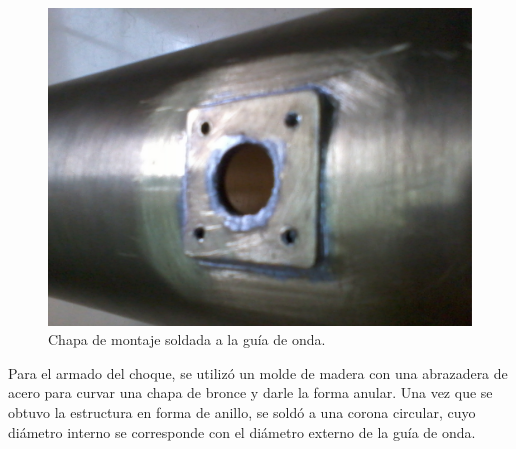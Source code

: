 \begin{figure} [H]
\centering 
\includegraphics[scale = 0.17]{Figures/Resultados/resultados_5}
\caption{Chapa de montaje soldada a la guía de onda.}
\label{fig_resultados:5}
\end{figure}
Para el armado del choque, se utilizó un molde de madera con una abrazadera de acero para curvar una chapa de bronce y darle la forma anular. Una vez que se obtuvo la estructura en forma de anillo, se soldó a una corona circular, cuyo diámetro interno se corresponde con el diámetro externo de la guía de onda.
